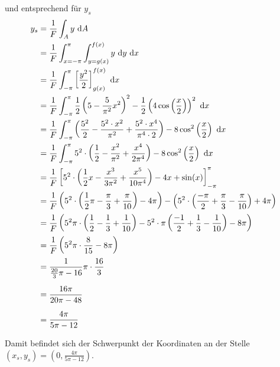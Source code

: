 \documentclass[main.tex]{subfiles}
\begin{document}
und entsprechend für $y_s$
\begin{align*}
    y_s &= \frac{1}{F} \int_{A}y ~\mathrm{d}A \\
        &= \frac{1}{F} \int_{x=-\pi}^{\pi} \int_{y=g(x)}^{f(x)} y ~\mathrm{d}y ~\mathrm{d}x \\
        &= \frac{1}{F} \int_{-\pi}^{\pi} \left[ \frac{y^2}{2} \right]_{g(x)}^{f(x)} ~\mathrm{d}x \\
        &= \frac{1}{F} \int_{-\pi}^{\pi} \frac{1}{2} \left(5 - \frac{5}{\pi^2} x^2 \right)^2 - \frac{1}{2}\left(4 \cos \left( \frac{x}{2} \right)\right)^2 ~\mathrm{d}x \\
        &= \frac{1}{F} \int_{-\pi}^{\pi} \left(\frac{5^2}{2} - \frac{5^2\cdot x^2}{\pi^2} + \frac{5^2\cdot x^4}{\pi^4\cdot 2} \right) - 8 \cos^2 \left( \frac{x}{2} \right) ~\mathrm{d}x \\
        &= \frac{1}{F} \int_{-\pi}^{\pi} 5^2\cdot \left(\frac{1}{2} - \frac{x^2}{\pi^2} + \frac{x^4}{2\pi^4} \right) - 8 \cos^2 \left( \frac{x}{2} \right) ~\mathrm{d}x \\
        &= \frac{1}{F} \left[ 5^2\cdot \left(\frac{1}{2} x - \frac{x^3}{3\pi^2} + \frac{x^5}{10\pi^4} \right) - 4x +\sin(x) \right]_{-\pi}^{\pi} \\
        &= \frac{1}{F} \left( 5^2\cdot \left(\frac{1}{2} \pi - \frac{\pi}{3} + \frac{\pi}{10} \right) - 4\pi \right)
            - \left( 5^2\cdot \left(\frac{-\pi}{2} + \frac{\pi}{3} - \frac{\pi}{10} \right) + 4\pi \right) \\
        &= \frac{1}{F} \left( 5^2 \pi \cdot \left(\frac{1}{2} - \frac{1}{3} + \frac{1}{10} \right)
            - 5^2\cdot \pi \left(\frac{-1}{2} + \frac{1}{3} - \frac{1}{10} \right) - 8\pi \right)\\
        &= \frac{1}{F} \left( 5^2 \pi \cdot \frac{8}{15} - 8\pi \right) \\
        &= \frac{1}{\frac{20}{3} \pi - 16} \pi \cdot \frac{16}{3} \\[2mm]
        &= \frac{16\pi}{20\pi - 48} \\[2mm]
        &= \frac{4\pi}{5\pi - 12} \\
\end{align*}

Damit befindet sich der Schwerpunkt der Koordinaten an der Stelle $(x_s, y_s) = \left(0, \frac{4\pi}{5\pi - 12}\right)$.
\end{document}
